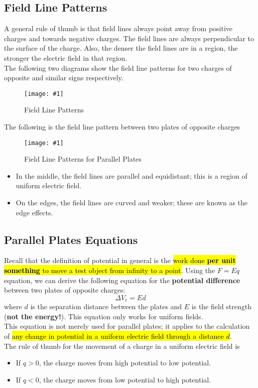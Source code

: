 \documentclass[a4paper,12pt]{article}
\newcommand{\lb}{\\[8pt]}
\newcommand{\img}[4]{\begin{center}
  \begin{figure}[H]
    \centering
    \texttt{[image: \#1]}
    \caption{#3}
    \label{fig:#4}
  \end{figure}
\end{center}}
\begin{document}
\pagebreak

\subsection{Field Line Patterns}

A general rule of thumb is that field lines always point away from positive charges and towards negative charges. The field lines are always perpendicular to the surface of the charge. Also, the denser the field lines are in a region, the stronger the electric field in that region.\lb
The following two diagrams show the field line patterns for two charges of opposite and similar signs respectively.
\img{fieldlines.jpg}{0.8}{Field Line Patterns}{fieldlines}

The following is the field line pattern between two plates of opposite charges
\img{plates.jpeg}{0.4}{Field Line Patterns for Parallel Plates}{plates}
\begin{itemize}
  \item In the middle, the field lines are parallel and equidistant; this is a region of uniform electric field.
  \item On the edges, the field lines are curved and weaker;  these are known as the edge effects.
\end{itemize}

\subsection{Parallel Plates Equations}

Recall that the definition of potential in general is the \hl{work done \textbf{per unit something} to move a test object from infinity to a point}. Using the $F = Eq$ equation, we can derive the following equation for the \textbf{potential difference} between two plates of opposite charges:
\begin{equation}\label{eq:plates}
  \Delta V_e = Ed
\end{equation}
where $d$ is the separation distance between the plates and $E$ is the field strength (\textbf{not the energy!}). This equation only works for uniform fields.\lb
This equation is not merely used for parallel plates; it applies to the calculation of \hl{any change in potential in a uniform electric field through a distance $d$}.\lb
The rule of thumb for the movement of a charge in a uniform electric field is
\begin{itemize}
  \item If $q > 0$, the charge moves from high potential to low potential.
  \item If $q < 0$, the charge moves from low potential to high potential.
\end{itemize}
\end{document}
